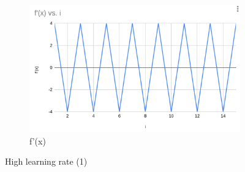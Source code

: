 \documentclass{article}
\begin{document}
\begin{figure}
    \begin{subfigure}{0.3\linewidth}
        \centering
        \includegraphics[width=\linewidth]{f_prime_l.png}
        \caption{f'(x)}
        \label{fig:enter-label}
    \end{subfigure}
    \caption{High learning rate (1)}
    \label{fig:enter-label}
\end{figure}
\end{document}
